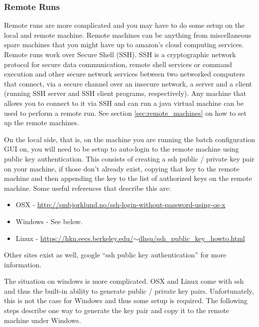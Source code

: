 \documentclass[11pt]{amsart}
\begin{document}
\subsubsection{Remote Runs}
\label{sec:distributed_runs}
Remote runs are more complicated and you may have to do some setup on the local and remote machine. Remote machines can be anything from miscellaneous spare machines that you might have up to amazon's cloud computing services. Remote runs work over Secure Shell (SSH). SSH is a cryptographic network protocol for secure data communication, remote shell services or command execution and other secure network services between two networked computers that connect, via a secure channel over an insecure network, a server and a client (running SSH server and SSH client programs, respectively). Any machine that allows you to connect to it via SSH and can run a java virtual machine can be used to perform a remote run. See section \ref{sec:remote_machines} on how to set up the remote machines.

On the local side, that is, on the machine you are running the batch configuration GUI on, you will need to be setup to auto-login to the remote machine using public key authentication. This consists of creating a ssh public / private key pair on your machine, if those don't already exist, copying that key to the remote machine and then appending the key to the list of authorized keys on the remote machine. Some useful references that describe this are:

\begin{itemize}
\item OSX - \href{http://smbjorklund.no/ssh-login-without-password-using-os-x}{http://smbjorklund.no/ssh-login-without-password-using-os-x}
\item Windows - See below.
\item Linux - \href{https://hkn.eecs.berkeley.edu/~dhsu/ssh_public_key_howto.html}{https://hkn.eecs.berkeley.edu/$\sim$dhsu/ssh\_public\_key\_howto.html}
\end{itemize}

\noindent
Other sites exist as well,  google ``ssh public key authentication'' for more information.

The situation on windows is more complicated. OSX and Linux come with ssh and thus the built-in ability to generate public / private key pairs. Unfortunately, this is not the case for Windows and thus some setup is required. The following steps describe one way to generate the key pair and copy it to the remote machine under Windows.
\end{document}
